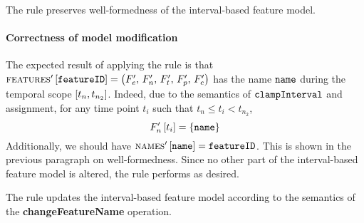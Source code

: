 \begin{lemma}
   The  rule preserves well-formedness of the interval-based feature model. 
   \label{lemma:change-feature-name-well-formed}
\end{lemma}

\paragraph{Correctness of model modification}
The expected result of applying the rule is that $\textsc{features}' \left[ \texttt{featureID} \right] = \left(F'_e,\, F'_n,\, F'_t,\, F'_p,\, F'_c\right)$ has the name $\texttt{name}$ during the temporal scope $\interval{t_n}{t_{n_2}}$. Indeed, due to the semantics of $\texttt{clampInterval}$ and assignment, for any time point $t_i$ such that $t_n \leq t_i < t_{n_2}$,
\[
   F'_n \left[ t_i \right] = \left\{\texttt{name}\right\}
\]
Additionally, we should have $\textsc{names}' \left[ \texttt{name} \right] = \texttt{featureID}$. This is shown in the previous paragraph on well-formedness.
Since no other part of the interval-based feature model is altered, the rule performs as desired.
\\

\begin{lemma}
   The  rule updates the interval-based feature model according to the semantics of the \textbf{changeFeatureName} operation.
   \label{lemma:change-feature-name-mod}
\end{lemma}

